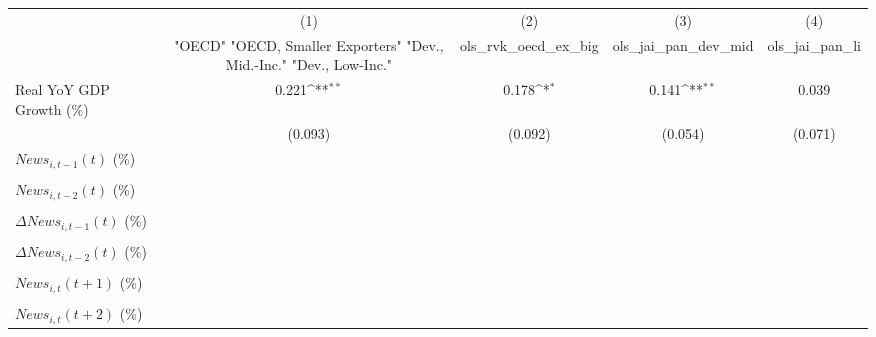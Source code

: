 {
\def\sym#1{\ifmmode^{#1}\else\(^{#1}\)\fi}
\begin{tabular}{l*{4}{c}}
\toprule
                    &\multicolumn{1}{c}{(1)}&\multicolumn{1}{c}{(2)}&\multicolumn{1}{c}{(3)}&\multicolumn{1}{c}{(4)}\\
                    &\multicolumn{1}{c}{ "OECD" "OECD, Smaller Exporters" "Dev., Mid.-Inc." "Dev., Low-Inc."}&\multicolumn{1}{c}{ols_rvk_oecd_ex_big}&\multicolumn{1}{c}{ols_jai_pan_dev_mid}&\multicolumn{1}{c}{ols_jai_pan_li}\\
\midrule
Real YoY GDP Growth (\%)&       0.221\sym{**} &       0.178\sym{*}  &       0.141\sym{**} &       0.039         \\
                    &     (0.093)         &     (0.092)         &     (0.054)         &     (0.071)         \\
\addlinespace
$ News_{i,t-1}(t)$ (\%)&                     &                     &                     &                     \\
                    &                     &                     &                     &                     \\
\addlinespace
$ News_{i,t-2}(t)$ (\%)&                     &                     &                     &                     \\
                    &                     &                     &                     &                     \\
\addlinespace
$ \Delta News_{i,t-1}(t)$ (\%)&                     &                     &                     &                     \\
                    &                     &                     &                     &                     \\
\addlinespace
$ \Delta News_{i,t-2}(t)$ (\%)&                     &                     &                     &                     \\
                    &                     &                     &                     &                     \\
\addlinespace
$ News_{i,t}(t+1)$ (\%)&                     &                     &                     &                     \\
                    &                     &                     &                     &                     \\
\addlinespace
$ News_{i,t}(t+2)$ (\%)&                     &                     &                     &                     \\

\end{tabular}}
